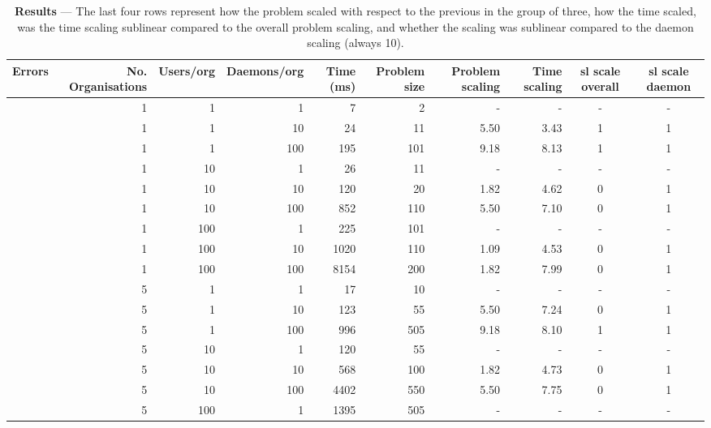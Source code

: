\documentclass{l3proj}
\begin{document}
\begin{table}
\begin{center}
  \caption{\textbf{Results} --- The last four rows represent how the problem scaled with respect to the previous in the group of three, how the time scaled, was the time scaling sublinear compared to the overall problem scaling, and whether the scaling was sublinear compared to the daemon scaling (always 10).}
  \label{tab:ServerEvalTab}
  \begin{tabular}{ | c | r | r | r || r || r | r | r | c | c | }
    \hline
      \rowcolor{DarkGrey}
     \textbf{Errors} & \textbf{No. Organisations} & \textbf{Users/org} & \textbf{Daemons/org} & \textbf{Time (ms)} & \textbf{Problem size} & \textbf{Problem scaling} & \textbf{Time scaling} & \textbf{sl scale overall} & \textbf{sl scale daemon} \\ \hline
      & 1 & 1 & 1 & 7 & 2 & - & - & - & - \\  
      \rowcolor{Grey}
      & 1 & 1 & 10 & 24 & 11 & 5.50 & 3.43 & 1 & 1 \\ 
      & 1 & 1 & 100 & 195 & 101 & 9.18 & 8.13 & 1 & 1 \\ 
      \rowcolor{Grey}
      & 1 & 10 & 1 & 26 & 11 & - & - & - & - \\  
      & 1 & 10 & 10 & 120 & 20 & 1.82 & 4.62 & 0 & 1 \\ 
      \rowcolor{Grey}
      & 1 & 10 & 100 & 852 & 110 & 5.50 & 7.10 & 0 & 1 \\  
      & 1 & 100 & 1 & 225 & 101 & - & - & - & - \\  
      \rowcolor{Grey}
      & 1 & 100 & 10 & 1020 & 110 & 1.09 & 4.53 & 0 & 1 \\ 
      & 1 & 100 & 100 & 8154 & 200 & 1.82 & 7.99 & 0 & 1 \\  
      \rowcolor{Grey}
      & 5 & 1 & 1 & 17 & 10 & - & - & - & - \\  
      & 5 & 1 & 10 & 123 & 55 & 5.50 & 7.24 & 0 & 1 \\  
      \rowcolor{Grey}
      & 5 & 1 & 100 & 996 & 505 & 9.18 & 8.10 & 1 & 1 \\  
      & 5 & 10 & 1 & 120 & 55 & - & - & - & - \\ 
      \rowcolor{Grey}
      & 5 & 10 & 10 & 568 & 100 & 1.82 & 4.73 & 0 & 1 \\  
      & 5 & 10 & 100 & 4402 & 550 & 5.50 & 7.75 & 0 & 1 \\  
      \rowcolor{Grey}
      & 5 & 100 & 1 & 1395 & 505 & - & - & - & - \\ 

\end{tabular}
\end{center}
\end{table}
\end{document}

